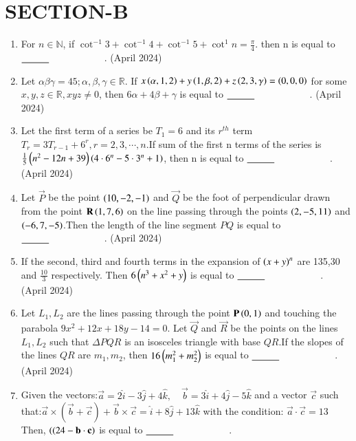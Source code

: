 \documentclass[journal,12pt,onecolumn]{IEEEtran}
\theoremstyle{remark}
\begin{document}
    \section{SECTION-B}
    \begin{enumerate}
        \item For $n \in \mathbb{N}$, if $\cot^{-1}3+\cot^{-1}4+\cot^{-1}5+\cot^{1}n=\frac{\pi}{4}$. then n is equal to $\makebox[3cm][l]{\underline{\hspace{1cm}}}$.
\hfill{(April 2024)} 
\item Let $\alpha\beta\gamma=45;\alpha,\beta,\gamma \in \mathbb{R}$. If $x\left(\alpha,1,2\right)+y\left(1,\beta,2\right)+z\left(2,3,\gamma\right)=\left(0,0,0\right)$ for some $x,y,z \in \mathbb{R},xyz \neq 0$, then $6\alpha+4\beta+\gamma$ is equal to $\makebox[3cm][l]{\underline{\hspace{1cm}}}$.
\hfill{(April 2024)} 
\item Let the first term of a series be $T_1=6$ and its $r^{th}$ term $T_r=3T_{r-1}+6^r,r=2,3,\cdots,n$.If sum of the first n terms of the series is $\frac{1}{5}\left(n^2-12n+39\right)\left(4\cdot6^n-5\cdot 3^n +1\right)$, then n is equal to $\makebox[3cm][l]{\underline{\hspace{1cm}}}$.
\hfill{(April 2024)} 
\item Let $\vec{P}$ be the point $\left(10,-2,-1\right)$ and $\vec{Q}$ be the foot of perpendicular drawn from the point $\mathbf{R}\left(1,7,6\right)$ on the line passing through the points $\left(2,-5,11\right)$ and $\left(-6,7,-5\right)$.Then the length of the line segment $PQ$ is equal to $\makebox[3cm][l]{\underline{\hspace{1cm}}}$.
\hfill{(April 2024)} 
\item If the second, third and fourth terms in the expansion of $\left(x+y\right)^n$ are 135,30 and $\frac{10}{3}$ respectively. Then $6\left(n^3+x^2+y\right)$ is equal to $\makebox[3cm][l]{\underline{\hspace{1cm}}}$.
\hfill{(April 2024)} 
\item Let $L_1,L_2$ are the lines passing through the point $\mathbf{P}\left(0,1\right)$ and touching the parabola $9x^2+12x+18y-14=0$. Let $\vec{Q}$ and $\vec{R}$ be the points on the lines $L_1,L_2$ such that $\Delta PQR$ is an isosceles triangle with base $QR$.If the slopes of the lines $QR$ are $m_1,m_2$, then $16\left(m_1^2+m_2^2\right)$ is equal to $\makebox[3cm][l]{\underline{\hspace{1cm}}}$.
\hfill{(April 2024)} 
\item Given the vectors:$\vec{a} = 2\hat{i} - 3\hat{j} + 4\hat{k}, \quad \vec{b} = 3\hat{i} + 4\hat{j} - 5\hat{k}$ and a vector $\vec{c}$ such that:$\vec{a} \times (\vec{b} + \vec{c}) + \vec{b} \times \vec{c} = \hat{i} + 8\hat{j} + 13\hat{k}$ with the condition: $\vec{a} \cdot \vec{c} = 13$ Then,  $\left(( 24 - \mathbf{b} \cdot \mathbf{c} \right)$ is equal to $\makebox[3cm][l]{\underline{\hspace{1cm}}}$.

\end{enumerate}
\end{document}
